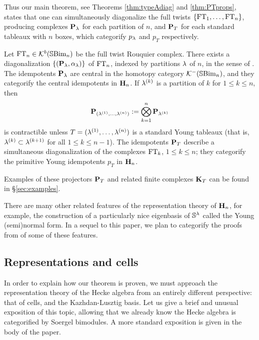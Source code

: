Thus our main theorem, see Theorems \ref{thm:typeAdiag} and \ref{thm:PTprops}, states that one can simultaneously diagonalize the full twists $\{\operatorname{FT}_1, \ldots,
\operatorname{FT}_n\}$, producing complexes ${\mathbf P}_\lambda$ for each partition of $n$, and ${\mathbf P}_T$ for each standard tableaux with $n$ boxes, which categorify $p_\lambda$ and $p_T$ respectively.

\begin{theorem}\label{thm:introFTdiag}
Let $\operatorname{FT}_n\in {\mathcal{K}}^b({\mathbb{S}}{\rm Bim }_n)$ be the full twist Rouquier complex.  There exists a diagonalization $\{({\mathbf P}_\lambda, \alpha_\lambda)\}$ of $\operatorname{FT}_n$, indexed by partitions $\lambda$ of $n$, in the sense of \cite[Definition 6.16]{ElHog17a}.  The idempotents ${\mathbf P}_\lambda$ are central in the homotopy category ${\mathcal{K}}^-({\mathbb{S}}{\rm Bim }_n)$, and they categorify the central idempotents in ${\mathbf H}_n$.  If $\lambda^{(k)}$ is a partition of $k$ for $1 \le k \le n$, then
\[
{\mathbf P}_{(\lambda^{(1)},\ldots,\lambda^{(n)})}:=\bigotimes_{k=1}^n {\mathbf P}_{\lambda^{(k)}}
\]
is contractible unless $T=(\lambda^{(1)},\ldots,\lambda^{(n)})$ is a standard Young tableaux (that is, $\lambda^{(k)}\subset \lambda^{(k+1)}$ for all $1\leq k\leq n-1$).  The idempotents ${\mathbf P}_T$ describe a simultaneous diagonalization of the complexes $\operatorname{FT}_k$, $1\leq k\leq n$; they categorify the primitive Young idempotents $p_T$ in ${\mathbf H}_n$.
\end{theorem}

Examples of these projectors ${\mathbf P}_T$ and related finite complexes ${\mathbf K}_T$ can be found in \S \ref{sec:examples}.

\begin{remark} There are many other related features of the representation theory of ${\mathbf H}_n$, for example, the construction of a particularly nice eigenbasis of ${\mathbb{S}}^\lambda$ called the Young (semi)normal form. In a sequel to this paper, we plan to categorify the proofs from \cite{OV96} of some of these features. \end{remark}

\subsection{Representations and cells}

In order to explain how our theorem is proven, we must approach the representation theory of the Hecke algebra from an entirely different perspective: that of cells, and the
Kazhdan-Lusztig basis. Let us give a brief and unusual exposition of this topic, allowing that we already know the Hecke algebra is categorified by Soergel bimodules. A more standard
exposition is given in the body of the paper.

